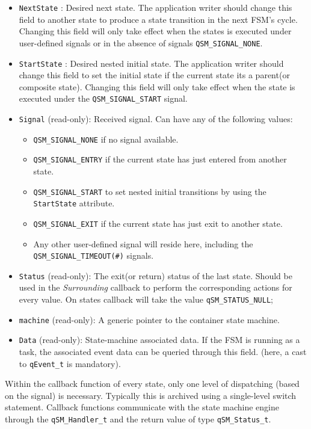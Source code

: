 \begin{itemize}
    \item \lstinline{NextState} : Desired next state. The application writer should change this field to another state to produce a state transition in the next FSM's cycle. Changing this field will only take effect when the states is executed under user-defined signals or in the absence of signals \lstinline{QSM_SIGNAL_NONE}.
    \item \lstinline{StartState} :  Desired nested initial state. The application writer should change this field to set the initial state if the current state its a parent(or composite state). Changing this field will only take effect when the state is executed under the \lstinline{QSM_SIGNAL_START} signal.
    \item \lstinline{Signal} (read-only): Received signal. Can have any of the following values: 
    \begin{itemize}
        \item \lstinline{QSM_SIGNAL_NONE} if no signal available.
        \item \lstinline{QSM_SIGNAL_ENTRY} if the current state has just entered from another state.
        \item \lstinline{QSM_SIGNAL_START} to set nested initial transitions by using the \lstinline{StartState} attribute.
        \item \lstinline{QSM_SIGNAL_EXIT} if the current state has just exit to another state.
        \item Any other user-defined signal will reside here, including the \lstinline{QSM_SIGNAL_TIMEOUT(#)} signals.
    \end{itemize}    
    \item \lstinline{Status} (read-only): The exit(or return) status of the last state. Should be used in the \textit{Surrounding} callback to perform the corresponding actions for every value. On states callback will take the value \lstinline{qSM_STATUS_NULL};
    \item \lstinline{machine} (read-only):  A generic pointer to the container state machine.
    \item \lstinline{Data} (read-only): State-machine associated data. If the FSM is running as a task, the associated event data can be queried through this field. (here, a cast to \lstinline{qEvent_t} is mandatory).
\end{itemize}


Within the callback function of every state, only one level of dispatching (based on the signal) is necessary. Typically this is archived using a single-level switch statement.
Callback functions communicate with the state machine engine through the \lstinline{qSM_Handler_t} and the return value of type \lstinline{qSM_Status_t}.


